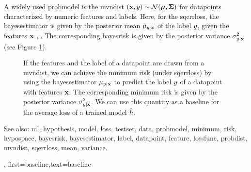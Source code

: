 {{A widely used \gls{probmodel} is the \gls{mvndist} $\left( {\bf x},y \right) \sim \mathcal{N}({\bm \mu},{\bm \Sigma})$ 
for \glspl{datapoint} characterized by numeric \glspl{feature} and \glspl{label}.
Here, for the \gls{sqerrloss}, the \gls{bayesestimator} is given by the posterior 
\gls{mean} $\mu_{y|{\bf x}}$ of the \gls{label} $y$, given the 
\glspl{feature} ${\bf x}$ \cite{LC}, \cite{GrayProbBook}. The corresponding \gls{bayesrisk} 
is given by the posterior \gls{variance} 
$\sigma^{2}_{y|{\bf x}}$ (see Figure \ref{fig_post_baseline_dict}).
	\begin{figure}[H]
		\begin{center}
		\end{center}
		\caption{If the \glspl{feature} and the \gls{label} of a \gls{datapoint} are drawn from a \gls{mvndist}, we 
		can achieve the \gls{minimum} \gls{risk} (under \gls{sqerrloss}) by using the \gls{bayesestimator} $\mu_{y|{\bf x}}$ 
		to predict the \gls{label} $y$ of a \gls{datapoint} with \glspl{feature} ${\bf x}$. The corresponding 
		\gls{minimum} \gls{risk} is given by the posterior \gls{variance} $\sigma^{2}_{y|{\bf x}}$. We can use 
		this quantity as a baseline for the average \gls{loss} of a trained \gls{model} $\hat{h}$. 
		\label{fig_post_baseline_dict}}
	\end{figure}
		See also: \gls{ml}, \gls{hypothesis}, \gls{model}, \gls{loss}, \gls{testset}, \gls{data}, \gls{probmodel}, \gls{minimum}, \gls{risk}, \gls{hypospace}, \gls{bayesrisk}, \gls{bayesestimator}, \gls{label}, \gls{datapoint}, \gls{feature}, \gls{lossfunc}, \gls{probdist}, \gls{mvndist}, \gls{sqerrloss}, \gls{mean}, \gls{variance}.},
    first={baseline},text={baseline}
}

